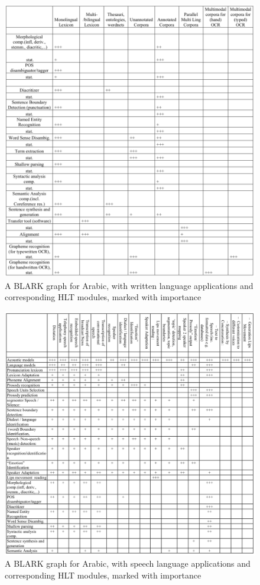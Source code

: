 \begin{figure}
 \centering
 \includegraphics[width=1\textwidth]{img/blark1.png}
 \caption{A BLARK graph for Arabic, with written language applications and corresponding HLT modules, marked with importance \citep[775]{maegaard2006blark}}
 \label{fig:blark1}
\end{figure}

\begin{figure}
 \centering
 \includegraphics[width=1\textwidth]{img/blark2.png}
 \caption{A BLARK graph for Arabic, with speech language applications and corresponding HLT modules, marked with importance \citep[776]{maegaard2006blark}}
 \label{fig:blark2}
\end{figure}

